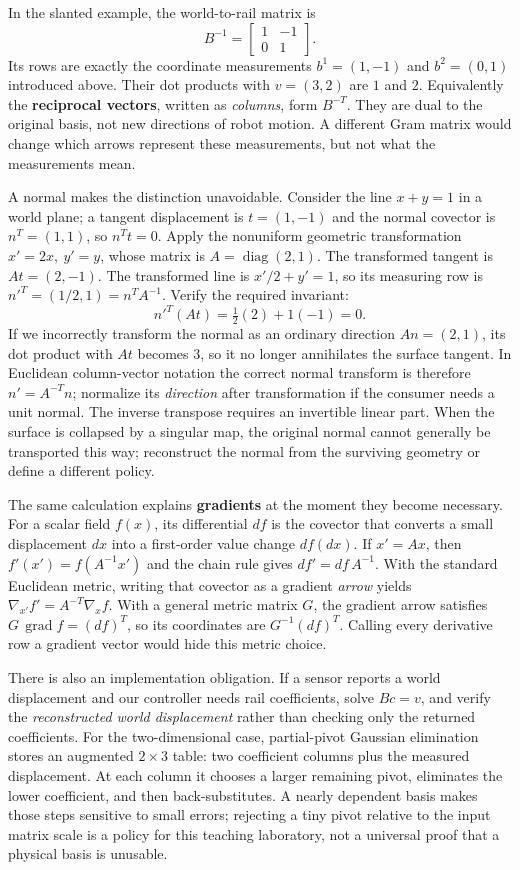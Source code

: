 In the slanted example, the world-to-rail matrix is \[
B^{-1}=\begin{bmatrix}1&-1\\0&1\end{bmatrix}.
\] Its rows are exactly the coordinate measurements \(b^1=(1,-1)\) and \(b^2=(0,1)\) introduced above. Their dot products with \(v=(3,2)\) are \(1\) and \(2\). Equivalently the \textbf{reciprocal vectors}, written as \emph{columns}, form \(B^{-T}\). They are dual to the original basis, not new directions of robot motion. A different Gram matrix would change which arrows represent these measurements, but not what the measurements mean.

A normal makes the distinction unavoidable. Consider the line \(x+y=1\) in a world plane; a tangent displacement is \(t=(1,-1)\) and the normal covector is \(n^T=(1,1)\), so \(n^Tt=0\). Apply the nonuniform geometric transformation \(x'=2x,\ y'=y\), whose matrix is \(A=\operatorname{diag}(2,1)\). The transformed tangent is \(At=(2,-1)\). The transformed line is \(x'/2+y'=1\), so its measuring row is \(n'^T=(1/2,1)=n^TA^{-1}\). Verify the required invariant: \[
n'^T(At)=\tfrac12(2)+1(-1)=0.
\] If we incorrectly transform the normal as an ordinary direction \(An=(2,1)\), its dot product with \(At\) becomes \(3\), so it no longer annihilates the surface tangent. In Euclidean column-vector notation the correct normal transform is therefore \(n'=A^{-T}n\); normalize its \emph{direction} after transformation if the consumer needs a unit normal. The inverse transpose requires an invertible linear part. When the surface is collapsed by a singular map, the original normal cannot generally be transported this way; reconstruct the normal from the surviving geometry or define a different policy.

The same calculation explains \textbf{gradients} at the moment they become necessary. For a scalar field \(f(x)\), its differential \(df\) is the covector that converts a small displacement \(dx\) into a first-order value change \(df(dx)\). If \(x'=Ax\), then \(f'(x')=f(A^{-1}x')\) and the chain rule gives \(df'=df\,A^{-1}\). With the standard Euclidean metric, writing that covector as a gradient \emph{arrow} yields \(\nabla_{x'}f'=A^{-T}\nabla_x f\). With a general metric matrix \(G\), the gradient arrow satisfies \(G\,\operatorname{grad}f=(df)^T\), so its coordinates are \(G^{-1}(df)^T\). Calling every derivative row a gradient vector would hide this metric choice.

There is also an implementation obligation. If a sensor reports a world displacement and our controller needs rail coefficients, solve \(Bc=v\), and verify the \emph{reconstructed world displacement} rather than checking only the returned coefficients. For the two-dimensional case, partial-pivot Gaussian elimination stores an augmented \(2\times3\) table: two coefficient columns plus the measured displacement. At each column it chooses a larger remaining pivot, eliminates the lower coefficient, and then back-substitutes. A nearly dependent basis makes those steps sensitive to small errors; rejecting a tiny pivot relative to the input matrix scale is a policy for this teaching laboratory, not a universal proof that a physical basis is unusable.

